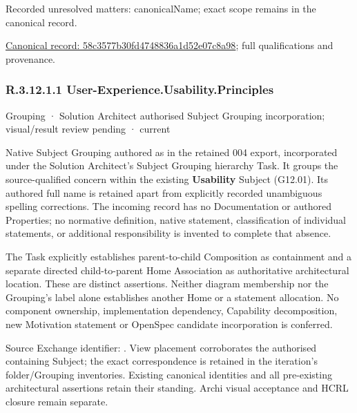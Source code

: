 {\small Recorded unresolved matters: canonicalName; exact scope remains in the canonical record.}\par
{\footnotesize \href{../../../../continuum/grouping/58c3577b30fd4748836a1d52e07c8a98.md}{Canonical record: 58c3577b30fd4748836a1d52e07c8a98}; full qualifications and provenance.}\par
\subsubsection*{R.3.12.1.1 User-Experience.Usability.Principles}
\label{navigation:R.3.12.1.1}

\label{element:493e4a05fe76496f82caf26e68f15edd}
{\small Grouping · Solution Architect authorised Subject Grouping incorporation; visual/result review pending · current}\par

Native Subject Grouping authored as \texttt{} in the retained 004 export,
incorporated under the Solution Architect's Subject Grouping hierarchy Task.
It groups the source-qualified \texttt{} concern within
the existing \textbf{Usability} Subject (G12.01). Its authored full name
is retained apart from explicitly recorded unambiguous spelling corrections.
The incoming record has no Documentation or authored Properties; no normative
definition, native statement, classification of individual statements, or
additional responsibility is invented to complete that absence.



The Task explicitly establishes parent-to-child Composition as containment and
a separate directed child-to-parent Home Association as authoritative architectural
location. These are distinct assertions. Neither diagram membership nor the
Grouping's label alone establishes another Home or a statement allocation.
No component ownership, implementation dependency, Capability decomposition,
new Motivation statement or OpenSpec candidate incorporation is conferred.



Source Exchange identifier: \texttt{}. View placement corroborates
the authorised containing Subject; the exact correspondence is retained in the
iteration's folder/Grouping inventories. Existing canonical identities and all
pre-existing architectural assertions retain their standing. Archi visual
acceptance and HCRL closure remain separate.


